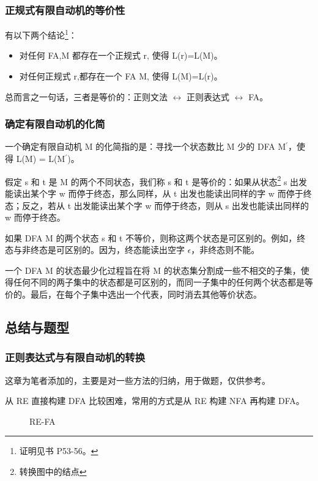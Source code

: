\subsubsection{正规式有限自动机的等价性}

有以下两个结论\footnote{证明见书 P53-56。}：
\begin{itemize}
    \item 对任何 FA,M 都存在一个正规式 r, 使得 L(r)=L(M)。
    \item 对任何正规式 r,都存在一个 FA M, 使得 L(M)=L(r)。
\end{itemize}

总而言之一句话，三者是等价的：正则文法 $\leftrightarrow$ 正则表达式 $\leftrightarrow$ FA。


\subsubsection{确定有限自动机的化简}

一个确定有限自动机 M 的化简指的是：寻找一个状态数比 M 少的 DFA M$^{'}$，使得 L(M) = L(M$^{'}$)。

假定 s 和 t 是 M 的两个不同状态，我们称 s 和 t 是等价的：如果从状态\footnote{转换图中的结点} s 出发能读出某个字 w 而停于终态，那么同样，从 t 出发也能读出同样的字 w 而停于终态；反之，若从 t 出发能读出某个字 w 而停于终态，则从 s 出发也能读出同样的 w 而停于终态。

如果 DFA M 的两个状态 s 和 t 不等价，则称这两个状态是可区别的。例如，终态与非终态是可区别的。因为，终态能读出空字 $\epsilon$，非终态则不能。

一个 DFA M 的状态最少化过程旨在将 M 的状态集分割成一些不相交的子集，使得任何不同的两子集中的状态都是可区别的，而同一子集中的任何两个状态都是等价的。最后，在每个子集中选出一个代表，同时消去其他等价状态。

\subsection{总结与题型}
\subsubsection{\textcolor{imp}{正则表达式与有限自动机的转换}}

这章为笔者添加的，主要是对一些方法的归纳，用于做题，仅供参考。

从 RE 直接构建 DFA 比较困难，常用的方式是从 RE 构建 NFA 再构建 DFA。

\begin{figure}[H]
    \centering
    \caption{RE-FA}
    \label{fig:RE-FA}
\end{figure}

